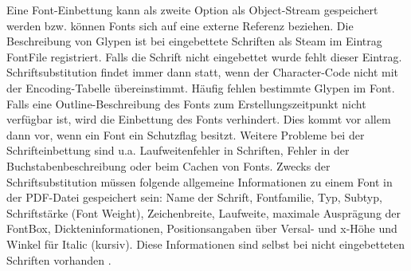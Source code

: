 Eine Font-Einbettung kann als zweite Option als Object-Stream gespeichert werden bzw. können Fonts sich auf eine externe Referenz beziehen. Die Beschreibung von Glypen ist bei eingebettete Schriften als Steam im Eintrag FontFile registriert. Falls die Schrift nicht eingebettet wurde fehlt dieser Eintrag. Schriftsubstitution findet immer dann statt, wenn der Character-Code nicht mit der Encoding-Tabelle übereinstimmt. Häufig fehlen bestimmte Glypen im Font. Falls eine Outline-Beschreibung des Fonts zum Erstellungszeitpunkt nicht verfügbar ist, wird die Einbettung des Fonts verhindert. Dies kommt vor allem dann vor, wenn ein Font ein Schutzflag besitzt. Weitere Probleme bei der Schrifteinbettung sind u.a. Laufweitenfehler in Schriften, Fehler in der Buchstabenbeschreibung oder beim Cachen von Fonts. Zwecks der Schriftsubstitution müssen folgende allgemeine Informationen zu einem Font in der PDF-Datei gespeichert sein: Name der Schrift, Fontfamilie, Typ, Subtyp, Schriftstärke (Font Weight), Zeichenbreite, Laufweite, maximale Ausprägung der FontBox, Dickteninformationen, Positionsangaben über Versal- und x-Höhe und Winkel für Italic (kursiv). Diese Informationen sind selbst bei nicht eingebetteten Schriften vorhanden \cite{schneeberger}. 